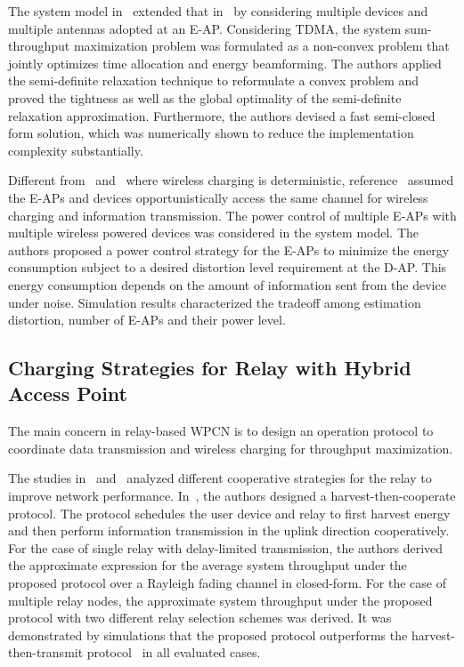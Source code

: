 \documentclass[twocolumn,10pt]{IEEEtran}
\begin{document}
The system model in~\cite{Q.2014Sun} extended that in~\cite{X.2014Zhou} by considering multiple devices and multiple antennas adopted at an E-AP.  Considering TDMA, the system sum-throughput maximization problem was formulated as a non-convex problem that jointly optimizes time allocation and energy beamforming. 
The authors applied the semi-definite relaxation technique to reformulate a convex problem and proved the tightness as well as the global optimality of the semi-definite relaxation approximation. Furthermore, the authors devised a fast semi-closed form solution, which was numerically shown to reduce the implementation complexity substantially. 

Different from~\cite{X.2014Zhou} and~\cite{Q.2014Sun} where wireless charging is deterministic, reference~\cite{O.2012Bicen} assumed the E-APs and devices opportunistically access the same channel for wireless charging and information transmission. The power control of multiple E-APs with multiple wireless powered devices was considered in the system model. The authors proposed a power control strategy for the E-APs to minimize the energy consumption subject to a desired distortion level requirement at the D-AP. This energy consumption depends on the amount of information sent from the device under noise. Simulation results characterized the tradeoff among estimation distortion, number of E-APs and their power level.




\subsection{Charging Strategies for Relay with Hybrid Access Point}

The main concern in relay-based WPCN is to design an operation protocol to coordinate data transmission and wireless charging for throughput maximization.

The studies in~\cite{H1404.4120Chen} and~\cite{H.2014Chen} analyzed different cooperative strategies for the relay to improve network performance.  In~\cite{H1404.4120Chen}, the authors designed a harvest-then-cooperate protocol. The protocol schedules the user device and relay to first harvest energy and then perform information transmission in the uplink direction cooperatively. For the case of single relay with delay-limited transmission, the authors derived the approximate expression for the average system throughput under the proposed protocol over a Rayleigh fading channel in closed-form. For the case of multiple relay nodes, the approximate system throughput under the proposed protocol with two different relay selection schemes was derived. It was demonstrated by simulations that the proposed protocol outperforms the harvest-then-transmit protocol~\cite{H.2014Ju} in all evaluated cases.
\end{document}
